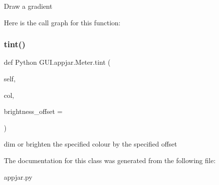\begin{DoxyVerb}Draw a gradient\end{DoxyVerb}
 Here is the call graph for this function\+:
\mbox{\label{class_python_01_g_u_i_1_1appjar_1_1_meter_a2a18129529a84f7d36a27bee02792ec3}} 
\subsubsection{\texorpdfstring{tint()}{tint()}}
{\footnotesize\ttfamily def Python G\+U\+I.\+appjar.\+Meter.\+tint (\begin{DoxyParamCaption}\item[{}]{self,  }\item[{}]{col,  }\item[{}]{brightness\+\_\+offset = {} }\end{DoxyParamCaption})}

\begin{DoxyVerb}dim or brighten the specified colour by the specified offset \end{DoxyVerb}
 

The documentation for this class was generated from the following file\+:\begin{DoxyCompactItemize}
\item 
appjar.\+py\end{DoxyCompactItemize}

